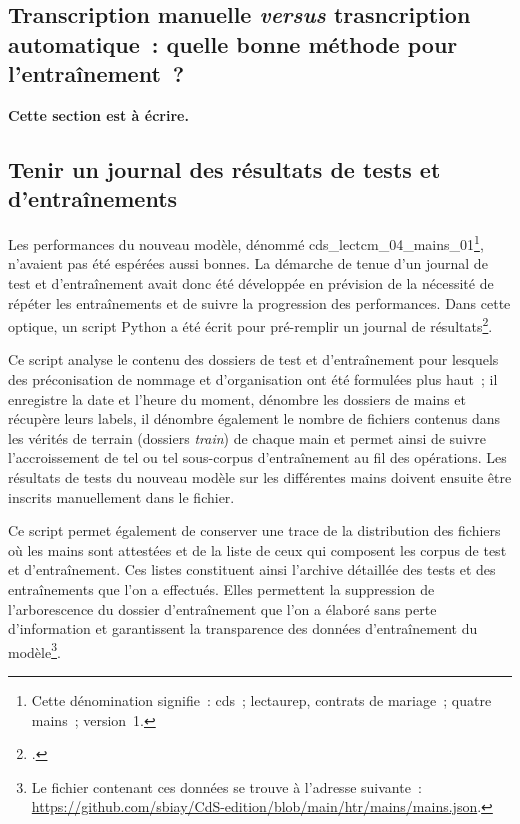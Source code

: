 \documentclass[a4paper,12pt,twoside]{book}
\begin{document}
			\subsection{Transcription manuelle \textit{versus} trasncription automatique~: quelle bonne méthode pour l'entraînement~?}
				\textbf{Cette section est à écrire.}
				
			\subsection{Tenir un journal des résultats de tests et d'entraînements}
				\label{journal-test}
				Les performances du nouveau modèle, dénommé \textsf{cds\_lectcm\_04\_mains\_01}\footnote{Cette dénomination signifie~: \gls{cds}~; \gls{lectaurep}, contrats de mariage~; quatre mains~; version~1.}, n'avaient pas été espérées aussi bonnes. La démarche de tenue d'un journal de test et d'entraînement avait donc été développée en prévision de la nécessité de répéter les entraînements et de suivre la progression des performances. Dans cette optique, un script Python a été écrit pour pré-remplir un journal de résultats\footcite{biayJournalReconnPy2022}. 
				
				Ce script analyse le contenu des dossiers de test et d'entraînement pour lesquels des préconisation de nommage et d'organisation ont été formulées plus haut~; il enregistre la date et l'heure du moment, dénombre les dossiers de mains et récupère leurs labels, il dénombre également le nombre de fichiers contenus dans les vérités de terrain (dossiers \textit{train}) de chaque main et permet ainsi de suivre l'accroissement de tel ou tel sous-corpus d'entraînement au fil des opérations. Les résultats de tests du nouveau modèle sur les différentes mains doivent ensuite être inscrits manuellement dans le fichier.
				
				Ce script permet également de conserver une trace de la distribution des fichiers où les mains sont attestées et de la liste de ceux qui composent les corpus de test et d'entraînement. Ces listes constituent ainsi l'archive détaillée des tests et des entraînements que l'on a effectués. Elles permettent la suppression de l'arborescence du dossier d'entraînement que l'on a élaboré sans perte d'information et garantissent la transparence des données d'entraînement du modèle\footnote{Le fichier contenant ces données se trouve à l'adresse suivante~: \url{https://github.com/sbiay/CdS-edition/blob/main/htr/mains/mains.json}.}.
				
\end{document}
